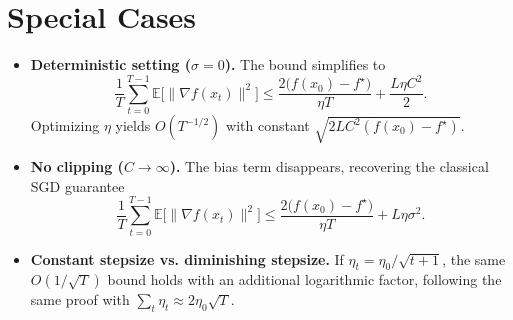 \documentclass{article}
\newcommand{\EE}{\mathbb{E}}
\begin{document}
\section*{Special Cases}
\begin{itemize}
\item \textbf{Deterministic setting ($\sigma=0$).} The bound simplifies to
\[
\frac{1}{T}\sum_{t=0}^{T-1}\EE\!\big[\|\nabla f(x_t)\|^2\big]
\le
\frac{2\big(f(x_0)-f^\star\big)}{\eta T}
+ \frac{L\eta C^2}{2}.
\]
Optimizing $\eta$ yields $O(T^{-1/2})$ with constant $\sqrt{2L C^2 (f(x_0)-f^\star)}$.
\item \textbf{No clipping ($C\to\infty$).} The bias term disappears, recovering the classical SGD guarantee
\[
\frac{1}{T}\sum_{t=0}^{T-1}\EE\!\big[\|\nabla f(x_t)\|^2\big]
\le
\frac{2\big(f(x_0)-f^\star\big)}{\eta T}
+ L\eta\sigma^2 .
\]
\item \textbf{Constant stepsize vs. diminishing stepsize.} If $\eta_t = \eta_0/\sqrt{t+1}$, the same $O(1/\sqrt{T})$ bound holds with an additional logarithmic factor, following the same proof with $\sum_{t}\eta_t \approx 2\eta_0\sqrt{T}$.
\end{itemize}
\end{document}
